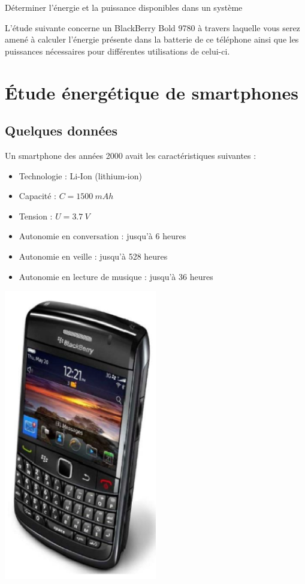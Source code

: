 \documentclass[10pt,fleqn]{article} %
\begin{document}

\begin{obj}
Déterminer l’énergie et la puissance disponibles dans un système

L’étude suivante concerne un BlackBerry Bold 9780 à travers laquelle vous serez amené à
 calculer l’énergie présente dans la batterie de ce téléphone ainsi que les puissances 
 nécessaires pour différentes utilisations de celui-ci.
 
\end{obj}
\section{Étude énergétique de smartphones}
\subsection{Quelques données}
Un smartphone des années 2000 avait les caractéristiques suivantes : 

\begin{minipage}[b]{0.8\textwidth}
  \begin{itemize}
 \item Technologie : Li-Ion (lithium-ion)
\item Capacité : $ C = \SI{1500}{mAh} $
\item Tension : $U=\SI{3.7}{V}$
\item Autonomie en conversation : jusqu'à 6 heures
\item Autonomie en veille : jusqu’à 528 heures
\item Autonomie en lecture de musique : jusqu'à 36 heures
\end{itemize}
\end{minipage}%
\begin{minipage}[b]{0.2\textwidth}
  \includegraphics[width=0.5\textwidth]{images/blackberry}
\end{minipage}
\end{document}
